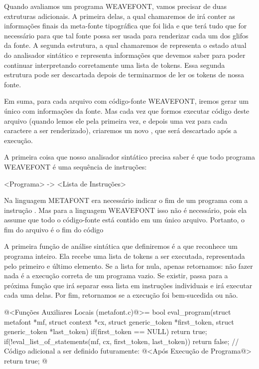 

Quando avaliamos um programa WEAVEFONT, vamos precisar de duas
extruturas adicionais. A primeira delas, a qual chamaremos
de  irá conter as informações finais da
meta-fonte tipográfica que foi lida e que terá tudo que for necessário
para que tal fonte possa ser usada para renderizar cada um dos glifos
da fonte. A segunda estrutura, a qual chamaremos de  representa o estado atual do analisador sintático e
representa informações que devemos saber para poder continuar
interpretando corretamente uma lista de tokens. Essa segunda estrutura
pode ser descartada depois de terminarmos de ler os tokens de nossa
fonte.

Em suma, para cada arquivo com código-fonte WEAVEFONT, iremos gerar um
único  com informações da fonte. Mas cada
vez que formos executar código deste arquivo (quando lemos ele pela
primeira vez, e depois uma vez para cada caractere a ser renderizado),
criaremos un novo , que será descartado
após a execução.

A primeira coisa que nosso analisador sintático precisa saber é que
todo programa WEAVEFONT é uma sequência de instruções:

\alinhaverbatim
<Programa> -> <Lista de Instruções>
\alinhanormal

Na linguagem METAFONT era necessário indicar o fim de um programa com
a instrução . Mas para a linguagem WEAVEFONT isso não
é necessário, pois ela assume que todo o código-fonte está contido em
um único arquivo. Portanto, o fim do arquivo é o fim do código

A primeira função de análise sintática que definiremos é a que
reconhece um programa inteiro. Ela recebe uma lista de tokens a ser
executada, representada pelo primeiro e último elemento. Se a lista
for nula, apenas retornamos: não fazer nada é a execução correta de um
programa vazio. Se existir, passa para a próxima função que irá
separar essa lista em instruções individuais e irá executar cada uma
delas. Por fim, retornamos se a execução foi bem-sucedida ou não.

\iniciocodigo
@<Funções Auxiliares Locais (metafont.c)@>=
bool eval_program(struct metafont *mf, struct context *cx,
                  struct generic_token *first_token,
                  struct generic_token *last_token){
  if(first_token == NULL)
    return true;
  if(!eval_list_of_statements(mf, cx, first_token, last_token))
    return false;
  // Código adicional a ser definido futuramente:
  @<Após Execução de Programa@>
  return true;
}
@
\fimcodigo

